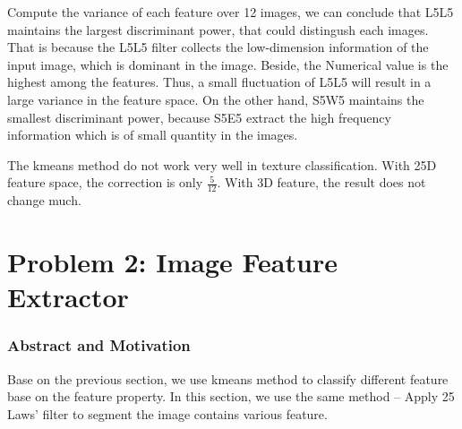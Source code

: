 \documentclass[11pt]{article}
\begin{document}
Compute the variance of each feature over 12 images, we can conclude that L5L5 maintains the largest discriminant power, that could distingush each images. That is because the L5L5 filter collects the low-dimension information of the input image, which is dominant in the image. Beside, the Numerical value is the highest among the features. Thus, a small fluctuation of L5L5 will result in a large variance in the feature space. On the other hand, S5W5 maintains the smallest discriminant power, because S5E5 extract the high frequency information which is of small quantity in the images. \par
\begin{table}[!htp]
\centering
\caption{Variance of the 25-D features}
\end{table}
The kmeans method do not work very well in texture classification. With 25D feature space, the correction is only $\frac{5}{12}$. With 3D feature, the result does not change much.

\section{Problem 2: Image Feature Extractor}

\subsubsection{Abstract and Motivation}
Base on the previous section, we use kmeans method to classify different feature base on the feature property. In this section, we use the same method -- Apply 25 Laws' filter to segment the image contains various feature. 
\end{document}
